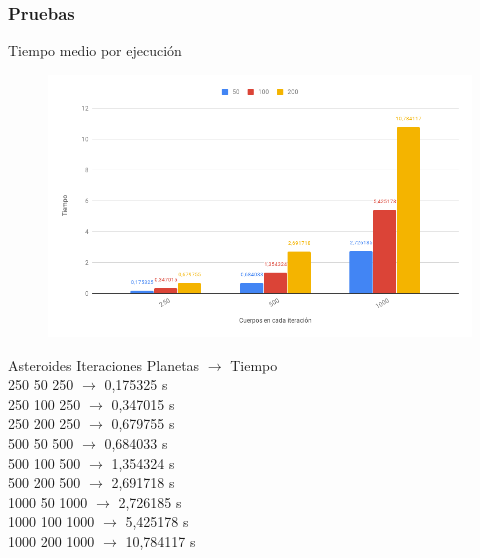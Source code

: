 \documentclass[12pt]{article}
\begin{document}
        \subsubsection{Pruebas}
            Tiempo medio por ejecución
            \begin{figure}[hbt!]
                \centering
                \includegraphics[width=\linewidth]{images/chart.png}
            \end{figure}
        
            \begin{center}
                \noindent Asteroides Iteraciones Planetas $\rightarrow$ Tiempo \\
                250 50 250 $\rightarrow$ 0,175325 s \\
                250 100 250 $\rightarrow$ 0,347015 s \\
                250 200 250 $\rightarrow$ 0,679755 s \\
                500 50 500 $\rightarrow$ 0,684033 s \\
                500 100 500 $\rightarrow$ 1,354324 s \\
                500 200 500 $\rightarrow$ 2,691718 s \\
                1000 50 1000 $\rightarrow$ 2,726185 s \\
                1000 100 1000 $\rightarrow$ 5,425178 s \\
                1000 200 1000 $\rightarrow$ 10,784117 s \\
            \end{center}
            
\end{document}

